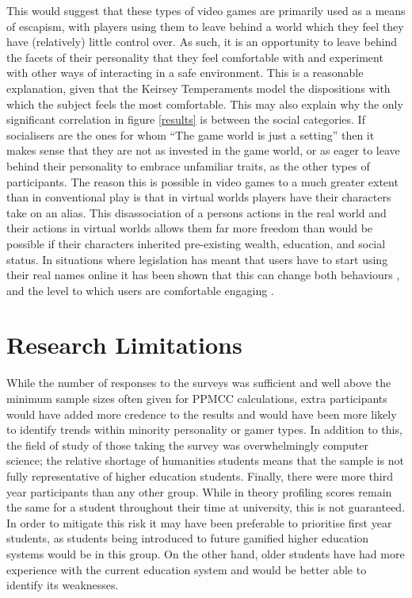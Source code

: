 \documentclass[12pt,a4paper,twoside]{report}
\begin{document}
This would suggest that these types of video games are primarily used as a means of escapism, with players using them to leave behind a world which they feel they have (relatively) little control over. As such, it is an opportunity to leave behind the facets of their personality that they feel comfortable with and experiment with other ways of interacting in a safe environment. This is a reasonable explanation, given that the Keirsey Temperaments model the dispositions with which the subject feels the most comfortable. This may also explain why the only significant correlation in figure \ref{results} is between the social categories. If socialisers are the ones for whom ``The game world is just a setting'' \cite{bartle1996hearts} then it makes sense that they are not as invested in the game world, or as eager to leave behind their personality to embrace unfamiliar traits, as the other types of participants. The reason this is possible in video games to a much greater extent than in conventional play is that in virtual worlds players have their characters take on an alias. This disassociation of a persons actions in the real world and their actions in virtual worlds allows them far more freedom than would be possible if their characters inherited pre-existing wealth, education, and social status. In situations where legislation has meant that users have to start using their real names online it has been shown that this can change both behaviours \cite{cho2012empirical}, and the level to which users are comfortable engaging \cite{bellonline}.

\section{Research Limitations}
While the number of responses to the surveys was sufficient and well above the minimum sample sizes often given for PPMCC calculations, extra participants would have added more credence to the results and would have been more likely to identify trends within minority personality or gamer types. In addition to this, the field of study of those taking the survey was overwhelmingly computer science; the relative shortage of humanities students means that the sample is not fully representative of higher education students. Finally, there were more third year participants than any other group. While in theory profiling scores remain the same for a student throughout their time at university, this is not guaranteed. In order to mitigate this risk it may have been preferable to prioritise first year students, as students being introduced to future gamified higher education systems would be in this group. On the other hand, older students have had more experience with the current education system and would be better able to identify its weaknesses.
\end{document}
